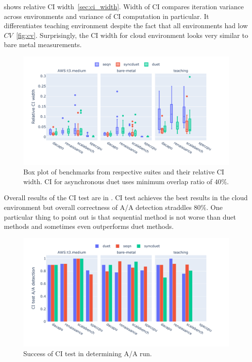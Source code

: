  shows relative CI width~\ref{sec:ci_width}.
Width of CI compares iteration variance across environments and variance of CI computation in particular.
It differentiates teaching environment despite the fact that all environments had low $CV$~\ref{fig:cv}.
Surprisingly, the CI width for cloud environment looks very similar to bare metal measurements.

\begin{figure}
	\centering
	\includegraphics[width=1\linewidth]{./figures/ci_width.pdf}
	\caption{
		Box plot of benchmarks from respective suites and their relative CI width. 
		CI for asynchronous duet uses minimum overlap ratio of $40\%$.
	}
	\label{fig:ci_width}
\end{figure}

Overall results of the CI test are in .
CI test achieves the best results in the cloud environment but overall correctness of A/A detection straddles $80\%$.
One particular thing to point out is that sequential method is not worse than duet methods and sometimes even outperforms duet methods.

\begin{figure}
	\centering
	\includegraphics[width=1\linewidth]{./figures/citest_aa_match.pdf}
	\caption{
		Success of CI test in determining A/A run.
	}
	\label{fig:citest_aa}
\end{figure}

